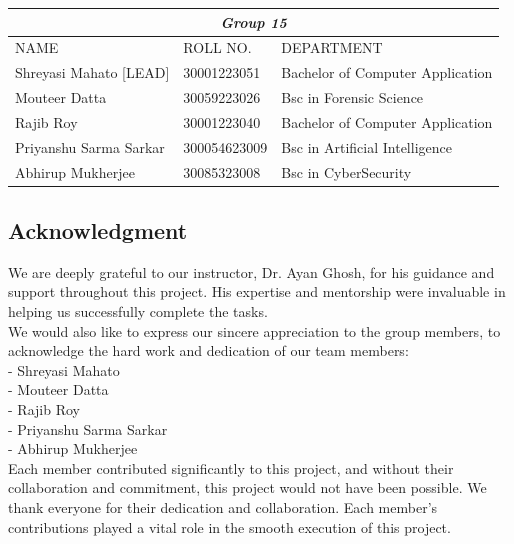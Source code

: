 \documentclass{article}
\begin{document}
\begin{center}

\vspace{9 cm}
\renewcommand{\arraystretch}{2.5}
\hspace*{-2.25in}
\begin{tabular}{ |p{3cm}|p{4cm}|p{5cm}| }
\hline
\multicolumn{3}{|c|}{\Large \textbf{\textit{Group 15}}} \\
\hline
NAME & ROLL NO.& DEPARTMENT \\
\hline
Shreyasi Mahato [LEAD]& 30001223051& Bachelor of Computer Application \\
\hline
Mouteer Datta& 30059223026& Bsc in Forensic Science\\
\hline
Rajib Roy& 30001223040& Bachelor of Computer Application\\
\hline
Priyanshu Sarma Sarkar& 300054623009& Bsc in Artificial Intelligence\\
\hline
Abhirup Mukherjee& 30085323008& Bsc in CyberSecurity\\
\hline
\end{tabular}

\end{center}

\newpage
\begin{center}
    \section*{Acknowledgment}
\end{center}

We are deeply grateful to our instructor, Dr. Ayan Ghosh, for his guidance and support throughout this project. His expertise and mentorship were invaluable in helping us successfully complete the tasks.\\

We would also like to express our sincere appreciation to the group members, to acknowledge the hard work and dedication of our team members:\\

- Shreyasi Mahato\\
- Mouteer Datta\\
- Rajib Roy\\
- Priyanshu Sarma Sarkar\\
- Abhirup Mukherjee\\

Each member contributed significantly to this project, and without their collaboration and commitment, this project would not have been possible. We thank everyone for their dedication and collaboration. Each member's contributions played a vital role in the smooth execution of this project.\\
\end{document}
